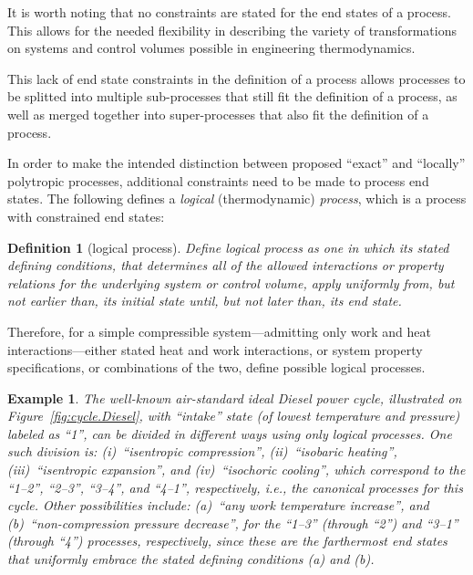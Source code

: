 \documentclass[fleqn,11pt]{SelfArx}
\newtheorem{definition}{Definition}
\newtheorem{example}{Example}
\begin{document}
    It is worth noting that no constraints are stated for the end  states  of  a  process.  This
    allows for the needed flexibility in describing the variety of  transformations  on  systems
    and control volumes possible in engineering thermodynamics.

    This lack of end state constraints in the definition of a process  allows  processes  to  be
    splitted into multiple sub-processes that still fit the definition of a process, as well as
    merged together into super-processes that also fit the definition of a process.

    In order to make  the  intended  distinction  between  proposed  ``exact''  and  ``locally''
    polytropic processes, additional constraints need to be made  to  process  end  states.  The
    following defines a \emph{logical} (thermodynamic) \emph{process}, which is a  process  with
    constrained end states:

    \begin{definition}[logical process]\label{def:logical.proc}
        Define logical process as one in which its stated defining conditions,  that  determines
        all of the allowed interactions or property  relations  for  the  underlying  system  or
        control volume, apply uniformly from, but not earlier than, its initial state until, but
        not later than, its end state.
    \end{definition}

    Therefore,   for   a   simple   compressible   system---admitting   only   work   and   heat
    interactions---either stated heat and work interactions, or system property  specifications,
    or combinations of the two, define possible logical processes.

    \begin{example}\label{ex:ideal.Diesel}
        The   well-known   air-standard   ideal   Diesel    power    cycle,    illustrated    on
        Figure~\ref{fig:cycle.Diesel},  with  ``intake''  state  (of  lowest   temperature   and
        pressure) labeled as ``1'',  can  be  divided  in  different  ways  using  only  logical
        processes.  One  such  division  is:  (i)~``isentropic  compression'',   (ii)~``isobaric
        heating'',  (iii)~``isentropic  expansion'',  and  (iv)~``isochoric   cooling'',   which
        correspond to the ``1--2'', ``2--3'', ``3--4'', and ``4--1'',  respectively,  i.e.,  the
        canonical  processes  for  this  cycle.  Other  possibilities  include:  (a)~``any  work
        temperature increase'', and (b)~``non-compression pressure decrease'', for the  ``1--3''
        (through ``2'') and ``3--1'' (through ``4'') processes, respectively,  since  these  are
        the farthermost end states that uniformly embrace the stated defining conditions (a) and
        (b).
    \end{example}
\end{document}
